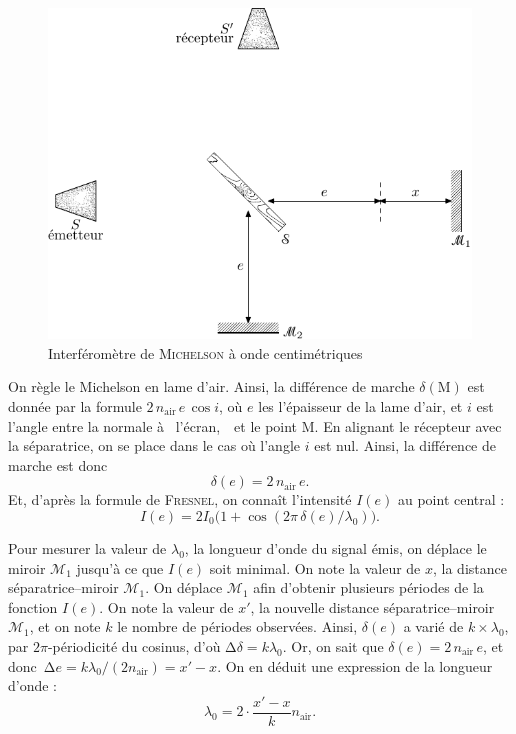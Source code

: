 \documentclass[a4paper,twocolumn,10pt,margin=0.5in]{extreport}
\begin{document}
	\begin{figure}[H]
		\centering
		\includegraphics[width=\linewidth]{figures/michelson-1.pdf}
		\caption{Interféromètre de \textsc{Michelson} à onde centimétriques}
		\label{fig:montage-michelson}
	\end{figure}

	On règle le Michelson en lame d'air.
	Ainsi, la différence de marche $\delta(\mathrm{M})$ est donnée par la formule $2\,n_\mathrm{air}\,e\,\cos i$, où $e$ les l'épaisseur de la lame d'air, et $i$ est l'angle entre la normale à \guillemotleft~l'écran,~\guillemotright\ et le point $\mathrm{M}$.
	En alignant le récepteur avec la séparatrice, on se place dans le cas où l'angle $i$ est nul.
	Ainsi, la différence de marche est donc \[
		\delta(e) = 2\,n_\mathrm{air}\,e.
	\]
	Et, d'après la formule de \textsc{Fresnel}, on connaît l'intensité $I(e)$ au point central : \[
		I(e) = 2I_0 \big(1 + \cos (2\pi\, \delta(e) / \lambda_0)\big)
	.\]

	Pour mesurer la valeur de $\lambda_0$, la longueur d'onde du signal émis, on déplace le miroir $\mathcal{M}_1$ jusqu'à ce que $I(e)$ soit minimal.
	On note la valeur de $x$, la distance séparatrice--miroir $\mathcal{M}_1$.
	On déplace $\mathcal{M}_1$ afin d'obtenir plusieurs périodes de la fonction $I(e)$.
	On note la valeur de $x'$, la nouvelle distance séparatrice--miroir $\mathcal{M}_1$, et on note $k$ le nombre de périodes observées.
	Ainsi, $\delta(e)$ a varié de $k \times \lambda_0$, par $2\pi$-périodicité du cosinus, d'où $\mathrm{\Delta}\delta = k\lambda_0$.
	Or, on sait que $\delta(e) = 2\,n_\mathrm{air}\,e$, et donc~$\mathrm{\Delta}e = k \lambda_0 / (2n_\mathrm{air}) = x' - x$.
	On en déduit une expression de la longueur d'onde : \[
		\lambda_0 = 2\cdot \frac{x' - x}{k} n_\mathrm{air}
	.\]
\end{document}
